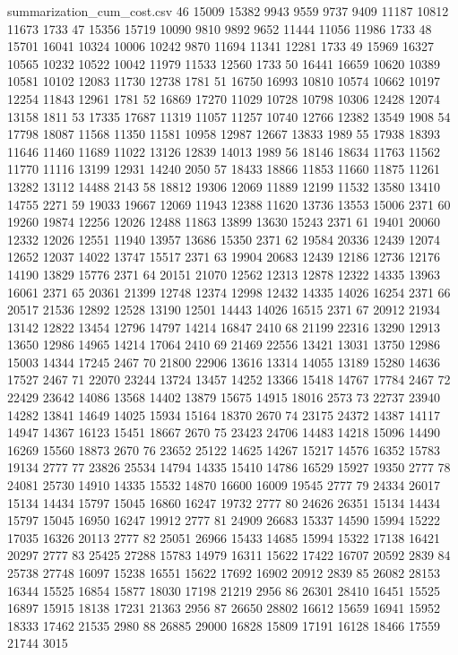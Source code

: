 \begin{filecontents*}{summarization_cum_cost.csv}
46	15009	15382	9943	9559	9737	9409	11187	10812	11673	1733
47	15356	15719	10090	9810	9892	9652	11444	11056	11986	1733
48	15701	16041	10324	10006	10242	9870	11694	11341	12281	1733
49	15969	16327	10565	10232	10522	10042	11979	11533	12560	1733
50	16441	16659	10620	10389	10581	10102	12083	11730	12738	1781
51	16750	16993	10810	10574	10662	10197	12254	11843	12961	1781
52	16869	17270	11029	10728	10798	10306	12428	12074	13158	1811
53	17335	17687	11319	11057	11257	10740	12766	12382	13549	1908
54	17798	18087	11568	11350	11581	10958	12987	12667	13833	1989
55	17938	18393	11646	11460	11689	11022	13126	12839	14013	1989
56	18146	18634	11763	11562	11770	11116	13199	12931	14240	2050
57	18433	18866	11853	11660	11875	11261	13282	13112	14488	2143
58	18812	19306	12069	11889	12199	11532	13580	13410	14755	2271
59	19033	19667	12069	11943	12388	11620	13736	13553	15006	2371
60	19260	19874	12256	12026	12488	11863	13899	13630	15243	2371
61	19401	20060	12332	12026	12551	11940	13957	13686	15350	2371
62	19584	20336	12439	12074	12652	12037	14022	13747	15517	2371
63	19904	20683	12439	12186	12736	12176	14190	13829	15776	2371
64	20151	21070	12562	12313	12878	12322	14335	13963	16061	2371
65	20361	21399	12748	12374	12998	12432	14335	14026	16254	2371
66	20517	21536	12892	12528	13190	12501	14443	14026	16515	2371
67	20912	21934	13142	12822	13454	12796	14797	14214	16847	2410
68	21199	22316	13290	12913	13650	12986	14965	14214	17064	2410
69	21469	22556	13421	13031	13750	12986	15003	14344	17245	2467
70	21800	22906	13616	13314	14055	13189	15280	14636	17527	2467
71	22070	23244	13724	13457	14252	13366	15418	14767	17784	2467
72	22429	23642	14086	13568	14402	13879	15675	14915	18016	2573
73	22737	23940	14282	13841	14649	14025	15934	15164	18370	2670
74	23175	24372	14387	14117	14947	14367	16123	15451	18667	2670
75	23423	24706	14483	14218	15096	14490	16269	15560	18873	2670
76	23652	25122	14625	14267	15217	14576	16352	15783	19134	2777
77	23826	25534	14794	14335	15410	14786	16529	15927	19350	2777
78	24081	25730	14910	14335	15532	14870	16600	16009	19545	2777
79	24334	26017	15134	14434	15797	15045	16860	16247	19732	2777
80	24626	26351	15134	14434	15797	15045	16950	16247	19912	2777
81	24909	26683	15337	14590	15994	15222	17035	16326	20113	2777
82	25051	26966	15433	14685	15994	15322	17138	16421	20297	2777
83	25425	27288	15783	14979	16311	15622	17422	16707	20592	2839
84	25738	27748	16097	15238	16551	15622	17692	16902	20912	2839
85	26082	28153	16344	15525	16854	15877	18030	17198	21219	2956
86	26301	28410	16451	15525	16897	15915	18138	17231	21363	2956
87	26650	28802	16612	15659	16941	15952	18333	17462	21535	2980
88	26885	29000	16828	15809	17191	16128	18466	17559	21744	3015

\end{filecontents*}
